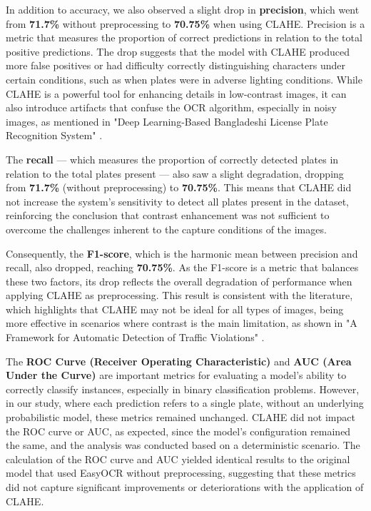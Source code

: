 \documentclass[conference]{IEEEtran}
\begin{document}
	In addition to accuracy, we also observed a slight drop in \textbf{precision}, which went from \textbf{71.7\%} without preprocessing to \textbf{70.75\%} when using CLAHE. Precision is a metric that measures the proportion of correct predictions in relation to the total positive predictions. The drop suggests that the model with CLAHE produced more false positives or had difficulty correctly distinguishing characters under certain conditions, such as when plates were in adverse lighting conditions. While CLAHE is a powerful tool for enhancing details in low-contrast images, it can also introduce artifacts that confuse the OCR algorithm, especially in noisy images, as mentioned in "Deep Learning-Based Bangladeshi License Plate Recognition System" \cite{b11}.
	
	The \textbf{recall} — which measures the proportion of correctly detected plates in relation to the total plates present — also saw a slight degradation, dropping from \textbf{71.7\%} (without preprocessing) to \textbf{70.75\%}. This means that CLAHE did not increase the system's sensitivity to detect all plates present in the dataset, reinforcing the conclusion that contrast enhancement was not sufficient to overcome the challenges inherent to the capture conditions of the images.
	
	Consequently, the \textbf{F1-score}, which is the harmonic mean between precision and recall, also dropped, reaching \textbf{70.75\%}. As the F1-score is a metric that balances these two factors, its drop reflects the overall degradation of performance when applying CLAHE as preprocessing. This result is consistent with the literature, which highlights that CLAHE may not be ideal for all types of images, being more effective in scenarios where contrast is the main limitation, as shown in "A Framework for Automatic Detection of Traffic Violations" \cite{b12}.
	
	The \textbf{ROC Curve (Receiver Operating Characteristic)} and \textbf{AUC (Area Under the Curve)} are important metrics for evaluating a model's ability to correctly classify instances, especially in binary classification problems. However, in our study, where each prediction refers to a single plate, without an underlying probabilistic model, these metrics remained unchanged. CLAHE did not impact the ROC curve or AUC, as expected, since the model's configuration remained the same, and the analysis was conducted based on a deterministic scenario. The calculation of the ROC curve and AUC yielded identical results to the original model that used EasyOCR without preprocessing, suggesting that these metrics did not capture significant improvements or deteriorations with the application of CLAHE.
	
\end{document}
